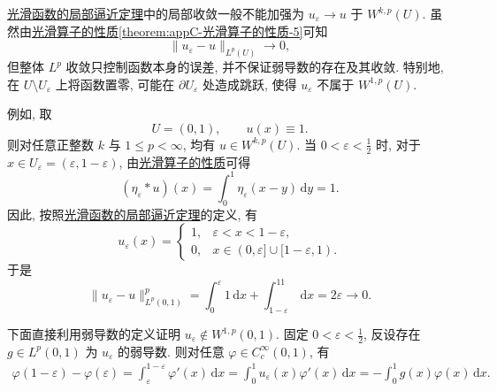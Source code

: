 \documentclass[../../main.tex]{subfiles}
\begin{document}
\begin{remark}
\hyperref[theorem:ch05-光滑函数的局部逼近定理]{光滑函数的局部逼近定理}中的局部收敛一般不能加强为
$u_\varepsilon\to u$ 于 $W^{k,p}(U)$.
虽然由\hyperref[theorem:appC-光滑算子的性质]{光滑算子的性质\ref{theorem:appC-光滑算子的性质-5}}可知
\[
\|u_\varepsilon-u\|_{L^p(U)}\to0,
\]
但整体 $L^p$ 收敛只控制函数本身的误差,
并不保证弱导数的存在及其收敛.
特别地, 在 $U\setminus U_\varepsilon$ 上将函数置零,
可能在 $\partial U_\varepsilon$ 处造成跳跃,
使得 $u_\varepsilon$ 不属于 $W^{1,p}(U)$.

例如, 取
\[
U=(0,1),\qquad u(x)\equiv1.
\]
则对任意正整数 $k$ 与 $1\leqslant p<\infty$,
均有 $u\in W^{k,p}(U)$.
当 $0<\varepsilon<\frac12$ 时,
对于 $x\in U_\varepsilon=(\varepsilon,1-\varepsilon)$,
由\hyperref[theorem:appC-光滑算子的性质]{光滑算子的性质}可得
\[
(\eta_\varepsilon*u)(x)
=\int_0^1\eta_\varepsilon(x-y)\,\mathrm{d}y=1.
\]
因此, 按照\hyperref[theorem:ch05-光滑函数的局部逼近定理]{光滑函数的局部逼近定理}的定义, 有
\[
u_\varepsilon(x)=
\begin{cases}
1,&\varepsilon<x<1-\varepsilon,\\
0,&x\in(0,\varepsilon]\cup[1-\varepsilon,1).
\end{cases}
\]
于是
\[
\|u_\varepsilon-u\|_{L^p(0,1)}^p
=\int_0^\varepsilon1\,\mathrm{d}x
+\int_{1-\varepsilon}^11\,\mathrm{d}x
=2\varepsilon\to0.
\]

下面直接利用弱导数的定义证明
$u_\varepsilon\notin W^{1,p}(0,1)$.
固定 $0<\varepsilon<\frac12$,
反设存在 $g\in L^p(0,1)$ 为 $u_\varepsilon$ 的弱导数.
则对任意 $\varphi\in C_c^\infty(0,1)$, 有
\begin{align}
\varphi(1-\varepsilon)-\varphi(\varepsilon)=\int_\varepsilon^{1-\varepsilon}\varphi'(x)\,\mathrm{d}x=\int_0^1u_\varepsilon(x)\varphi'(x)\,\mathrm{d}x
=-\int_0^1g(x)\varphi(x)\,\mathrm{d}x.\label{eq::JIOWJI3234823749235290850}
\end{align}


\end{remark}
\end{document}
